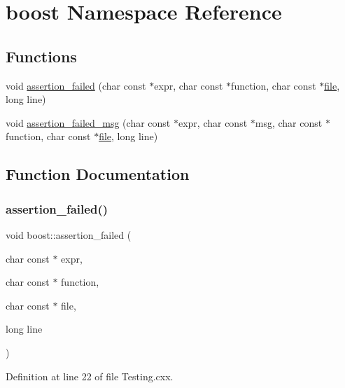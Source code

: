 \hypertarget{namespaceboost}{}\section{boost Namespace Reference}
\label{namespaceboost}
\subsection*{Functions}
\begin{DoxyCompactItemize}
\item 
void \hyperlink{namespaceboost_a6ea615b0e29a9b35870fb8662f0e1291}{assertion\+\_\+failed} (char const $\ast$expr, char const $\ast$function, char const $\ast$\hyperlink{classfile}{file}, long line)
\item 
void \hyperlink{namespaceboost_afbd4a259de77230355c3c2de9ce6d6c9}{assertion\+\_\+failed\+\_\+msg} (char const $\ast$expr, char const $\ast$msg, char const $\ast$function, char const $\ast$\hyperlink{classfile}{file}, long line)
\end{DoxyCompactItemize}


\subsection{Function Documentation}
\mbox{\label{namespaceboost_a6ea615b0e29a9b35870fb8662f0e1291}} 
\subsubsection{\texorpdfstring{assertion\+\_\+failed()}{assertion\_failed()}}
{\footnotesize\ttfamily void boost\+::assertion\+\_\+failed (\begin{DoxyParamCaption}\item[{char const $\ast$}]{expr,  }\item[{char const $\ast$}]{function,  }\item[{char const $\ast$}]{file,  }\item[{long}]{line }\end{DoxyParamCaption})}



Definition at line 22 of file Testing.\+cxx.

